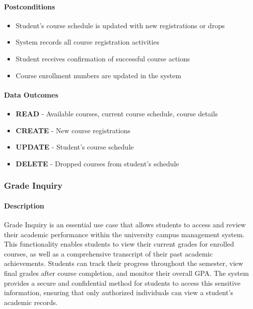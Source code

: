 \paragraph{Postconditions}
\begin{itemize}
    \item Student's course schedule is updated with new registrations or drops
    \item System records all course registration activities
    \item Student receives confirmation of successful course actions
    \item Course enrollment numbers are updated in the system
\end{itemize}

\paragraph{Data Outcomes}
\begin{itemize}
    \item \textbf{READ} - Available courses, current course schedule, course details
    \item \textbf{CREATE} - New course registrations
    \item \textbf{UPDATE} - Student's course schedule
    \item \textbf{DELETE} - Dropped courses from student's schedule
\end{itemize}

\subsubsection{Grade Inquiry}

\paragraph{Description}
Grade Inquiry is an essential use case that allows students to access and review their academic performance within the university campus management system. This functionality enables students to view their current grades for enrolled courses, as well as a comprehensive transcript of their past academic achievements. Students can track their progress throughout the semester, view final grades after course completion, and monitor their overall GPA. The system provides a secure and confidential method for students to access this sensitive information, ensuring that only authorized individuals can view a student's academic records.

